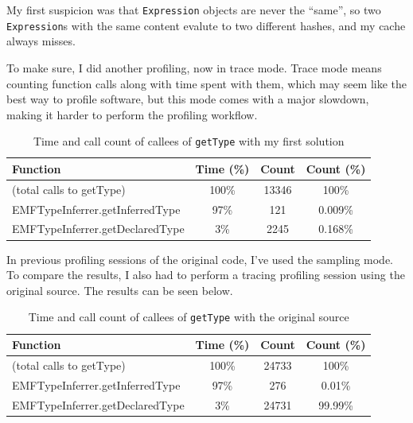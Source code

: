\documentclass[11pt,a4paper,oneside]{report}
\begin{document}
My first suspicion was that \texttt{Expression} objects are never the ``same'',
so two \texttt{Expression}s with the same content evalute to two different
hashes, and my cache always misses.

To make sure, I did another profiling, now in trace mode. Trace mode means
counting function calls along with time spent with them, which may seem like the
best way to profile software, but this mode comes with a major slowdown, making
it harder to perform the profiling workflow.

\begin{table}[ht]
    \footnotesize
    \centering
    \begin{tabular}{ l c c c }
        \toprule
        Function & Time (\%) & Count & Count (\%) \\
        \midrule
        (total calls to getType) & 100\% & 13346 & 100\% \\
        EMFTypeInferrer.getInferredType & 97\% & 121 & 0.009\% \\
        EMFTypeInferrer.getDeclaredType & 3\% & 2245 & 0.168\% \\
        \bottomrule
    \end{tabular}
    \caption{Time and call count of callees of \texttt{getType} with my first solution}
    \label{tab:first-solution-call-counts}
\end{table}

In previous profiling sessions of the original code, I've used the sampling
mode. To compare the results, I also had to perform a tracing profiling session
using the original source. The results can be seen below.

\begin{table}[ht]
    \footnotesize
    \centering
    \begin{tabular}{ l c c c }
        \toprule
        Function & Time (\%) & Count & Count (\%) \\
        \midrule
        (total calls to getType) & 100\% & 24733 & 100\% \\
        EMFTypeInferrer.getInferredType & 97\% & 276 & 0.01\% \\
        EMFTypeInferrer.getDeclaredType & 3\% & 24731 & 99.99\% \\
        \bottomrule
    \end{tabular}
    \caption{Time and call count of callees of \texttt{getType} with the original source}
    \label{tab:first-solution-call-counts}
\end{table}
\end{document}
